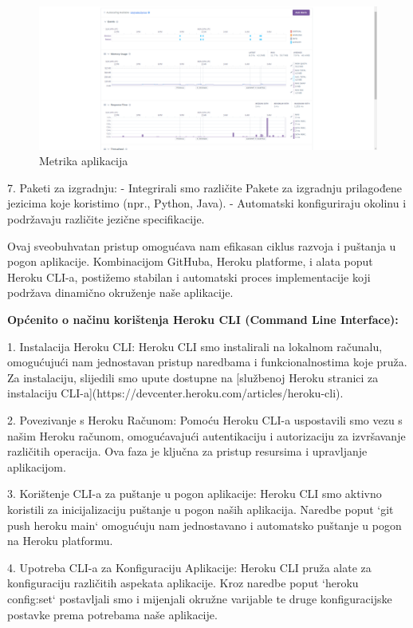 \begin{figure}[H]
    \centering
    \includegraphics[width=1\linewidth]{slike/metrics.png}
    \caption{Metrika aplikacija}
    \label{fig:enter-label}
\end{figure}
7. Paketi za izgradnju:
\newline- Integrirali smo različite Pakete za izgradnju prilagođene jezicima koje koristimo (npr., Python, Java).
\newline- Automatski konfiguriraju okolinu i podržavaju različite jezične specifikacije.

Ovaj sveobuhvatan pristup omogućava nam efikasan ciklus razvoja i puštanja u pogon aplikacije. Kombinacijom GitHuba, Heroku platforme, i alata poput Heroku CLI-a, postižemo stabilan i automatski proces implementacije koji podržava dinamično okruženje naše aplikacije.


\textbf{Općenito o načinu korištenja Heroku CLI (Command Line Interface):}

1. Instalacija Heroku CLI:
   Heroku CLI smo instalirali na lokalnom računalu, omogućujući nam jednostavan pristup naredbama i funkcionalnostima koje pruža. Za instalaciju, slijedili smo upute dostupne na [službenoj Heroku stranici za instalaciju CLI-a](https://devcenter.heroku.com/articles/heroku-cli).

2. Povezivanje s Heroku Računom:
    Pomoću Heroku CLI-a uspostavili smo vezu s našim Heroku računom, omogućavajući autentikaciju i autorizaciju za izvršavanje različitih operacija. Ova faza je ključna za pristup resursima i upravljanje aplikacijom.

3. Korištenje CLI-a za puštanje u pogon aplikacije:
    Heroku CLI smo aktivno koristili za inicijalizaciju puštanje u pogon naših aplikacija. Naredbe poput `git push heroku main` omogućuju nam jednostavano i automatsko puštanje u pogon na Heroku platformu.

4. Upotreba CLI-a za Konfiguraciju Aplikacije:
    Heroku CLI pruža alate za konfiguraciju različitih aspekata aplikacije. Kroz naredbe poput `heroku config:set` postavljali smo i mijenjali okružne varijable te druge konfiguracijske postavke prema potrebama naše aplikacije.

